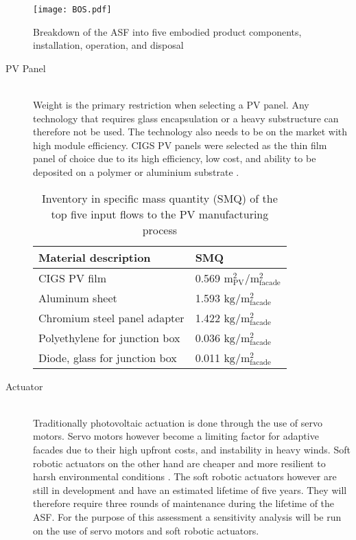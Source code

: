 \begin{figure}[ht]
\begin{center}
\texttt{[image: BOS.pdf]}
\caption{Breakdown of the ASF into five embodied product components, installation, operation, and disposal}

\label{fig:BOS}
\end{center}
\end{figure}

\begin{description}

\item[PV Panel] \hfill\\
Weight is the primary restriction when selecting a PV panel. Any technology that requires glass encapsulation or a heavy substructure can therefore not be used. The technology also needs to be on the market with high module efficiency. CIGS PV panels were selected as the thin film panel of choice due to its high efficiency, low cost, and ability to be deposited on a polymer or aluminium substrate \cite{chirilua2011highly}. 




\begin{table}[H]
\centering
\begin{tabular}{ll}
\hline
Material description & SMQ \\ \hline
CIGS PV film       	 & 0.569 ${\mathrm{m^2_{PV}/m^2_{facade}}}$\\
Aluminum sheet 	 & 1.593 ${\mathrm{kg/m^2_{facade}}}$\\
Chromium steel panel adapter  & 1.422 ${\mathrm{kg/m^2_{facade}}}$\\
Polyethylene for junction box & 0.036 ${\mathrm{kg/m^2_{facade}}}$\\
Diode, glass for junction box & 0.011 ${\mathrm{kg/m^2_{facade}}}$\\
\hline
\end{tabular}
\caption{Inventory in specific mass quantity (SMQ) of the top five input flows to the PV manufacturing process}
\label{tab:PVinv}
\end{table}

\item[Actuator] \hfill \\
Traditionally photovoltaic actuation is done through the use of servo motors. Servo motors however become a limiting factor for adaptive facades due to their high upfront costs, and instability in heavy winds. Soft robotic actuators on the other hand are cheaper and more resilient to harsh environmental conditions \cite{Svetozarevic2014a}. The soft robotic actuators however are still in development and have an estimated lifetime of five years. They will therefore require three rounds of maintenance during the lifetime of the ASF. For the purpose of this assessment a sensitivity analysis will be run on the use of servo motors and soft robotic actuators. 


\end{description}
